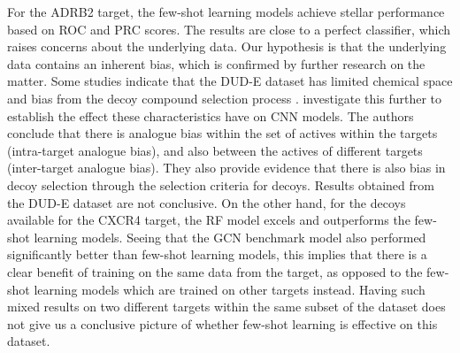 For the ADRB2 target, the few-shot learning models achieve stellar performance based on ROC and PRC scores. The results are close to a perfect classifier, which raises concerns about the underlying data. Our hypothesis is that the underlying data contains an inherent bias, which is confirmed by further research on the matter. Some studies indicate that the DUD-E dataset has limited chemical space and bias from the decoy compound selection process \cite{smusz2013influence, wallach2018most}. \citet{chen2019hidden} investigate this further to establish the effect these characteristics have on CNN models. The authors conclude that there is analogue bias within the set of actives within the targets (intra-target analogue bias), and also between the actives of different targets (inter-target analogue bias). They also provide evidence that there is also bias in decoy selection through the selection criteria for decoys. Results obtained from the DUD-E dataset are not conclusive. On the other hand, for the decoys available for the CXCR4 target, the RF model excels and outperforms the few-shot learning models. Seeing that the GCN benchmark model also performed significantly better than few-shot learning models, this implies that there is a clear benefit of training on the same data from the target, as opposed to the few-shot learning models which are trained on other targets instead. Having such mixed results on two different targets within the same subset of the dataset does not give us a conclusive picture of whether few-shot learning is effective on this dataset.

